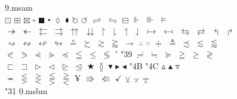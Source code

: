 \documentclass{article}
\begin{document}
9.msam\\
\noindent $\boxdot$ $\boxplus$ $\boxtimes$ $\square$ $\blacksquare$ $\centerdot$ $\lozenge$ $\blacklozenge$ $\circlearrowright$ $\circlearrowleft$ $\rightleftharpoons$ $\leftrightharpoons$ $\boxminus$ $\Vdash$ $\Vvdash$ $\vDash$\\
$\twoheadrightarrow$ $\twoheadleftarrow$ $\leftleftarrows$ $\rightrightarrows$ $\upuparrows$ $\downdownarrows$ $\upharpoonright$ $\downharpoonright$ $\upharpoonleft$ $\downharpoonleft$ $\rightarrowtail$ $\leftarrowtail$ $\leftrightarrows$ $\rightleftarrows$ $\Lsh$ $\Rsh$\\
$\rightsquigarrow$ $\leftrightsquigarrow$ $\looparrowleft$ $\looparrowright$ $\circeq$ $\succsim$ $\gtrsim$ $\gtrapprox$ $\multimap$ $\therefore$ $\because$ $\doteqdot$ $\triangleq$ $\precsim$ $\lesssim$ $\lessapprox$\\
$\eqslantless$ $\eqslantgtr$ $\curlyeqprec$ $\curlyeqsucc$ $\preccurlyeq$ $\leqq$ $\leqslant$ $\lessgtr$ $\backprime$ \selectfont\char"39 $\risingdotseq$ $\fallingdotseq$ $\succcurlyeq$ $\geqq$ $\geqslant$ $\gtrless$\\
$\sqsubset$ $\sqsupset$ $\vartriangleright$ $\vartriangleleft$ $\trianglerighteq$ $\trianglelefteq$ $\bigstar$ $\between$ $\blacktriangledown$ $\blacktriangleright$ $\blacktriangleleft$ \selectfont\char"4B  \selectfont\char"4C $\vartriangle$ $\blacktriangle$ $\triangledown$ \\
$\eqcirc$ $\lesseqgtr$ $\gtreqless$ $\lesseqqgtr$ $\gtreqqless$ $\yen$ $\Rrightarrow$ $\Lleftarrow$ $\checkmark$ $\veebar$ $\barwedge$ $\doublebarwedge$\\
\selectfont\char"31 0.msbm\\
\noindent 
\end{document}
